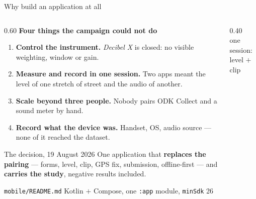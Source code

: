 \documentclass[aspectratio=169,10pt]{beamer}
\newcommand{\src}[1]{{\scriptsize\color{muted}\texttt{#1}}}
\newcommand{\aside}[1]{{\scriptsize\color{muted}#1}}
\begin{document}
\begin{frame}{Why build an application at all}
  \begin{columns}[T]
    \begin{column}{0.60\textwidth}
      \textbf{Four things the campaign could not do}
      \begin{enumerate}
        \item \textbf{Control the instrument.} \emph{Decibel X} is closed: no
              visible weighting, window or gain.
        \item \textbf{Measure and record in one session.} Two apps meant the
              level of one stretch of street and the audio of another.
        \item \textbf{Scale beyond three people.} Nobody pairs ODK Collect and a
              sound meter by hand.
        \item \textbf{Record what the device was.} Handset, OS, audio source ---
              none of it reached the dataset.
      \end{enumerate}
      \vspace{.3em}
      \begin{block}{The decision, 19 August 2026}
        One application that \textbf{replaces the pairing} --- forms, level,
        clip, GPS fix, submission, offline-first --- and \textbf{carries the
        study}, negative results included.
      \end{block}
      \src{mobile/README.md} \; \aside{Kotlin $+$ Compose, one \texttt{:app} module, \texttt{minSdk} 26}
    \end{column}
    \begin{column}{0.40\textwidth}
      \centering
      \scalebox{0.55}{\phoneMeasure}\\[.3em]
      \aside{one session: level $+$ clip}
    \end{column}
  \end{columns}
\end{frame}
\end{document}

